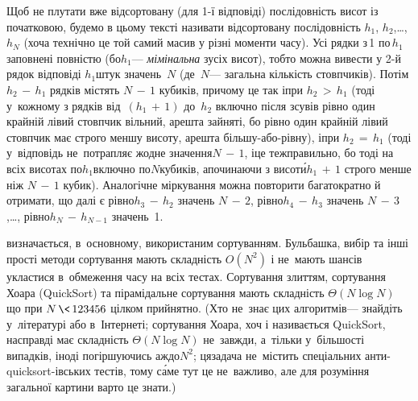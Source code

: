 Щоб не плутати вже відсортовану (для \mbox{1-ї} відповіді) послідовність висот із початковою, будемо в цьому тексті називати відсортовану послідовність $h_1$, $h_2$,\nolinebreak[3] \dots,\nolinebreak[1] $h_N$ (хоча технічно це той самий масив у різні моменти часу).
Усі рядки з\nolinebreak[3] \textnumero$\,$1 по\nolinebreak[3] \textnumero$\,h_1$ заповнені повністю (бо\nolinebreak[2] $h_1$\nolinebreak[3] --- \emph{мімінальна} з\nolinebreak[3] усіх висот), тобто можна вивести у \mbox{2-й} рядок відповіді $h_1$\nolinebreak[3] штук значень~$N$ (де~$N$\nolinebreak[3] --- загальна кількість стовпчиків). Потім ${h_2\,{-}\,h_1}$ рядків містять ${N\,{-}\,1}$ кубиків, причому це так і\nolinebreak[3] при ${h_2\,{>}\,h_1}$ (тоді у~кожному з рядків від \textnumero$\,{(h_1\,{+}\,1)}$ до \textnumero$\,h_2$ включно після зсувів рівно один крайній лівий стовпчик вільний, а\nolinebreak[3] решта зайняті, бо рівно один крайній лівий стовпчик має строго меншу висоту, а\nolinebreak[3] решта більшу-або-рівну), і\nolinebreak[3] при ${h_2\,{=}\,h_1}$ (тоді у~відповідь не~потрапляє жодне значення\nolinebreak[3] ${N\,{-}\,1}$, і\nolinebreak[3] це теж\nolinebreak[3] правильно, бо тоді на всіх висотах по\nolinebreak[3] $h_1$\nolinebreak[1] включно по\nolinebreak[3] $N$\nolinebreak[2] кубиків, а\nolinebreak[3] починаючи з висот\'{и}\nolinebreak[3] ${h_1\,{+}\,1}$ строго менше ніж ${N\,{-}\,1}$ кубик). Аналогічне міркування можна повторити багатократно й отримати, що далі є рівно\nolinebreak[3] ${h_3\,{-}\,h_2}$ значень ${N\,{-}\,2}$, рівно\nolinebreak[3] ${h_4\,{-}\,h_3}$ значень ${N\,{-}\,3}$,\nolinebreak[3] \dots, рівно\nolinebreak[3] ${h_{N}\,{-}\,h_{N-1}}$ значень~1.


 визначається, в~основному, використаним сортуванням. Бульбашка, вибір та інші прості методи сортування мають складність $O(N^2)$ і не~мають шансів укластися в~обмеження часу на всіх тестах. Сортування злиттям, сортування Хоара (QuickSort) та пірамідальне сортування мають складність $\Theta(N\log N)$ що при ${N\,{\<}\,123456}$ цілком прийнятно. 
%
%
(Хто не~знає цих алгоритмів\nolinebreak[3] --- знайдіть у~літературі або в~Інтернеті; сортування Хоара, хоч і називається QuickSort, насправді має складність $\Theta(N\log N)$ не~завжди, а~тільки у~більшості випадків, іноді погіршуючись аж\nolinebreak[3] до\nolinebreak[3] $N^2$; ця\nolinebreak[3] задача не~містить спеціальних анти-quick\-\mbox{sort-ів}\-ських тестів, тому с\'{а}ме тут це не~важливо, але для розуміння загальної картини варто це знати.)
%


